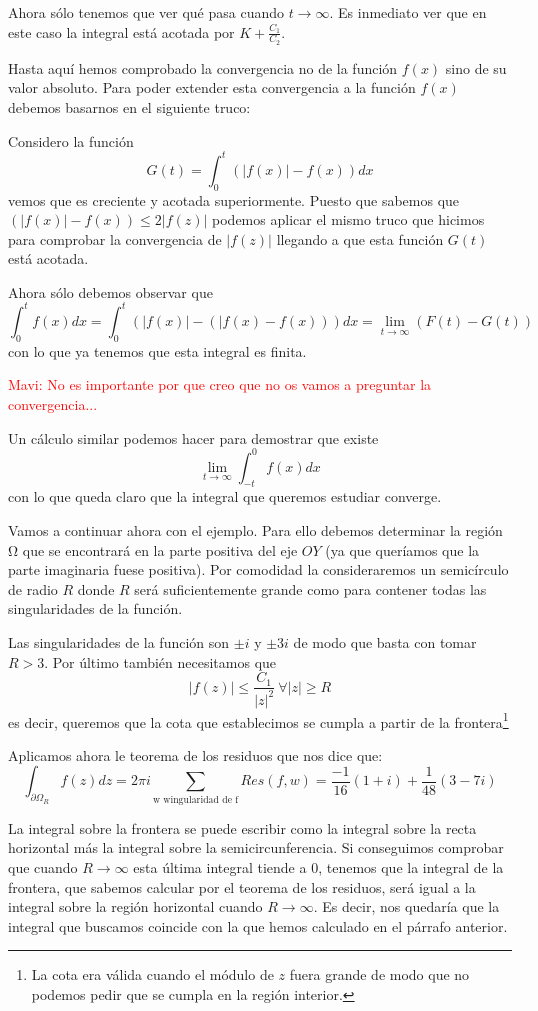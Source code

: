 \documentclass{apuntes}
\begin{document}
\begin{enumerate}
\begin{enumerate}
\begin{example}
Ahora sólo tenemos que ver qué pasa cuando $t \to \infty$. Es inmediato ver que en este caso la integral está acotada por $K+\frac{C_1}{C_2}$.

Hasta aquí hemos comprobado la convergencia no de la función $f(x)$ sino de su valor absoluto. Para poder extender esta convergencia a la función $f(x)$ debemos basarnos en el siguiente truco:

Considero la función
\[G(t)=\int_0^t \left( |f(x)|-f(x)\right)dx\]
vemos que es creciente y acotada superiormente. Puesto que sabemos que $\left( |f(x)|-f(x)\right) \leq 2|f(z)|$ podemos aplicar el mismo truco que hicimos para comprobar la convergencia de $|f(z)|$ llegando a que esta función $G(t)$ está acotada.

Ahora sólo debemos observar que
\[\int_0^tf(x)dx = \int_0^t \left( |f(x)|-(|f(x)-f(x))\right)dx = \lim_{t \to \infty} (F(t)-G(t))\]
con lo que ya tenemos que esta integral es finita.

\textcolor{red}{Mavi: No es importante por que creo que no os vamos a preguntar la convergencia...}

Un cálculo similar podemos hacer para demostrar que existe
\[\lim_{t \to \infty} \int_{-t}^0 f(x)dx\]
con lo que queda claro que la integral que queremos estudiar converge.

Vamos a continuar ahora con el ejemplo. Para ello debemos determinar la región Ω que se encontrará en la parte positiva del eje $OY$ (ya que queríamos que la parte imaginaria fuese positiva). Por comodidad la consideraremos un semicírculo de radio $R$ donde $R$ será suficientemente grande como para contener todas las singularidades de la función.

Las singularidades de la función son $\pm i$ y $\pm 3i$ de modo que basta con tomar $R>3$. Por último también necesitamos que
\[|f(z)| \leq \frac{C_1}{|z|^2} \ \forall |z| \geq R\]
es decir, queremos que la cota que establecimos se cumpla a partir de la frontera\footnote{La cota era válida cuando el módulo de $z$ fuera grande de modo que no podemos pedir que se cumpla en la región interior.}

Aplicamos ahora le teorema de los residuos que nos dice que:
\[\int_{\partial Ω_R} f(z)dz = 2πi\sum_{\text{w wingularidad de f}} Res(f,w) = \frac{-1}{16}(1+i)+\frac{1}{48}(3-7i)\]

La integral sobre la frontera se puede escribir como la integral sobre la recta horizontal más la integral sobre la semicircunferencia. Si conseguimos comprobar que cuando $R\to \infty$ esta última integral tiende a 0, tenemos que la integral de la frontera, que sabemos calcular por el teorema de los residuos, será igual a la integral sobre la región horizontal cuando $R \to \infty$. Es decir, nos quedaría que la integral que buscamos coincide con la que hemos calculado en el párrafo anterior.


\end{example}
\end{enumerate}
\end{enumerate}
\end{document}

